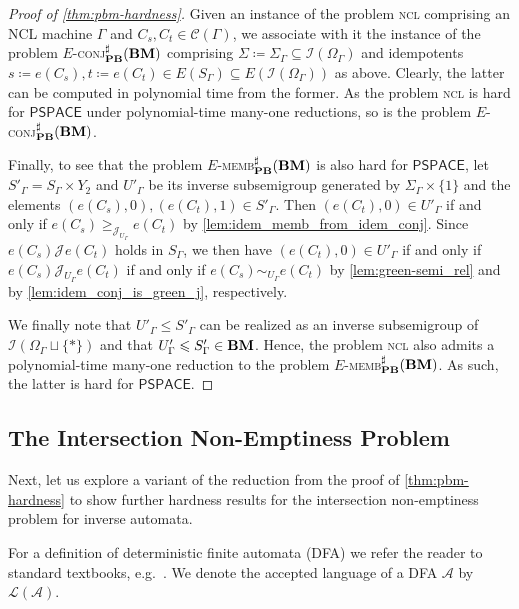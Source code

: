 \documentclass[anonymous,letter,UKenglish,cleveref,autoref,thm-restate]{lipics-v2021}
\renewcommand{\geq}{\geqslant}
\renewcommand{\leq}{\leqslant}
\newcommand{\eg}{e.g.~}
\newcommand{\sse}{\subseteq}
\newcommand{\PSPACE}{\ensuremath{\mathsf{PSPACE}}\xspace}
\newcommand{\ISym}{\cI}
\newcommand*{\gJ}[1][]{\mathrel{\mathcal{J}_{#1}}}
\newcommand*{\gJge}[1][]{\geq_{\mathcal{J}_{#1}}}
\newcommand{\cA}{\mathcal{A}}
\newcommand{\cL}{\mathcal{L}}
\newcommand{\cC}{\mathcal{C}}
\newcommand{\cI}{\mathcal{I}}
\theoremstyle{plain}
\theoremstyle{plain}
\newcommand{\dMembS}[2][]{\textup{\textsc{memb${}^{\sharp}_{\mathbf{#1}}\expandafter\ifx\expandafter\relax\detokenize{#2}\relax\else(#2)\fi$}}}
\newcommand{\dConjS}[2][]{\textup{\textsc{conj${}^{\sharp}_{\mathbf{#1}}\expandafter\ifx\expandafter\relax\detokenize{#2}\relax\else(#2)\fi$}}}
\newcommand{\prob}[1]{\textup{\textsc{#1}}\xspace}
\newcommand{\dNCL}{\prob{ncl}}
\newcommand{\dEMembS}[2][]{\ensuremath{E}\textnormal{-}\dMembS[#1]{#2}}
\newcommand{\dEConjS}[2][]{\ensuremath{E}\textnormal{-}\dConjS[#1]{#2}}
\begin{document}
\begin{proof}[Proof of \cref{thm:pbm-hardness}]
  Given an instance of the problem \dNCL{} comprising an NCL machine $\Gamma$ and $C_s, C_t \in \cC(\Gamma)$, we associate with it the instance of the problem \dEConjS[PB]{\vBM} comprising $\Sigma \coloneqq \Sigma_\Gamma \sse \ISym(\Omega_\Gamma)$ and idempotents $s \coloneqq e(C_s), t \coloneqq e(C_t) \in E(S_\Gamma) \sse E(\ISym(\Omega_\Gamma))$ as above.
  Clearly, the latter can be computed in polynomial time from the former.
  As the problem \dNCL{} is hard for \PSPACE{} under polynomial-time many-one reductions, so is the problem \dEConjS[PB]{\vBM}.

  \medskip

 Finally, to see that the problem \dEMembS[PB]{\vBM} is also hard for \PSPACE, let $S'_\Gamma = S_\Gamma \times Y_2$ and $U'_\Gamma$ be its inverse subsemigroup generated by $\Sigma_\Gamma \times \{1\}$ and the elements $(e(C_s), 0), (e(C_t), 1) \in S'_\Gamma$.
  Then $(e(C_t), 0) \in U'_\Gamma$ if and only if $e(C_s) \gJge[U_\Gamma] e(C_t)$ by \cref{lem:idem_memb_from_idem_conj}.
  Since $e(C_s) \gJ e(C_t)$ holds in $S_\Gamma$, we then have $(e(C_t), 0) \in U'_\Gamma$ if and only if $e(C_s) \gJ[U_\Gamma] e(C_t)$ if and only if $e(C_s) \sim_{U_\Gamma} e(C_t)$ by \cref{lem:green-semi_rel} and by \cref{lem:idem_conj_is_green_j}, respectively.

  We finally note that $U'_\Gamma \leq S'_\Gamma$ can be realized as an inverse subsemigroup of $\ISym(\Omega_\Gamma \sqcup \{\ast\})$ and that $U'_\Gamma \leq S'_\Gamma \in \vBM$.
  Hence, the problem \dNCL{} also admits a polynomial-time many-one reduction to the problem \dEMembS[PB]{\vBM}.
  As such, the latter is hard for \PSPACE.
\end{proof}


\subsection{The Intersection Non-Emptiness Problem}\label{sub:iai-hardness}

Next, let us explore a variant of the reduction from the proof of \cref{thm:pbm-hardness} to show further hardness results for the intersection non-emptiness problem for inverse automata.

For a definition of deterministic finite automata (DFA) we refer the reader to  standard textbooks, \eg \cite{HU}.
We denote the accepted language of a DFA $\cA$ by $\cL(\cA)$.
\end{document}

